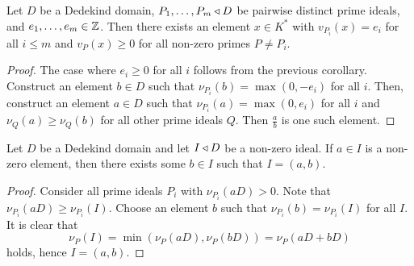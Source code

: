 \obvs

\begin{posledica}
Let $D$ be a Dedekind domain, $P_1, \dots, P_m \triangleleft D$ be
pairwise distinct prime ideals, and $e_1, \dots, e_m \in \mathbb{Z}$. Then
there exists an element $x \in K^*$ with $v_{P_i}(x) = e_i$ for all
$i \leq m$ and $v_P(x) \geq 0$ for all non-zero primes $P \ne P_i$.
\end{posledica}

\begin{proof}
The case where $e_i \geq 0$ for all $i$ follows from the previous
corollary. Construct an element $b \in D$ such that
$\nu_{P_i}(b) = \max(0, -e_i)$ for all $i$. Then, construct an
element $a \in D$ such that $\nu_{P_i}(a) = \max(0, e_i)$ for all
$i$ and $\nu_Q(a) \geq \nu_Q(b)$ for all other prime ideals $Q$.
Then $\frac{a}{b}$ is one such element.
\end{proof}

\begin{izrek}
Let $D$ be a Dedekind domain and let $I \triangleleft D$ be a non-zero
ideal. If $a \in I$ is a non-zero element, then there exists some
$b \in I$ such that $I = (a, b)$.
\end{izrek}

\begin{proof}
Consider all prime ideals $P_i$ with $\nu_{P_i}(aD) > 0$. Note that
$\nu_{P_i}(aD) \geq \nu_{P_i}(I)$. Choose an element
$b$ such that $\nu_{P_i}(b) = \nu_{P_i}(I)$ for all $I$. It is
clear that
\[
\nu_P(I) = \min(\nu_P(aD), \nu_P(bD)) = \nu_P(aD + bD)
\]
holds, hence $I = (a,b)$.
\end{proof}
